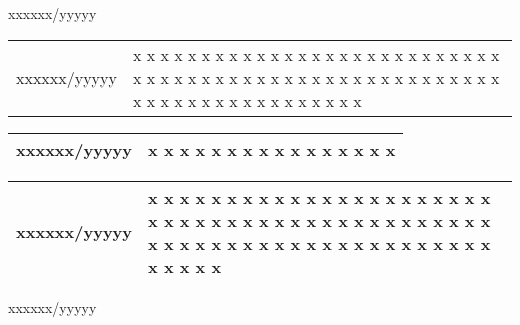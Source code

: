 xxxxxx/yyyyy

{%
\begin{tabular}{ | p{30mm} | p{129mm} | }
\hline
{\mktsStyleFontUrl{}xxxxxx/yyyyy} & x x x x x x x x x x x x x x x x x x x x x x x x x x x x x x x x x x x x x x x x x x x x x x x x x x x x x x x x x x x x x x x x x x x x x x x \\
\end{tabular}


\begin{tabular}{ | p{30mm} | p{129mm} | }
\hline
{\mktsStyleFontUrl{}xxxxxx/yyyyy} & x x x x x x x x x x x x x x x x \\
\hline
\end{tabular}


\begin{tabular}{ | p{30mm} | p{129mm} | }
{\mktsStyleFontUrl{}xxxxxx/yyyyy} & x x x x x x x x x x x x x x x x x x x x x x x x x x x x x x x x x x x x x x x x x x x x x x x x x x x x x x x x x x x x x x x x x x x x x x x \\
\hline
\end{tabular}
}


xxxxxx/yyyyy



